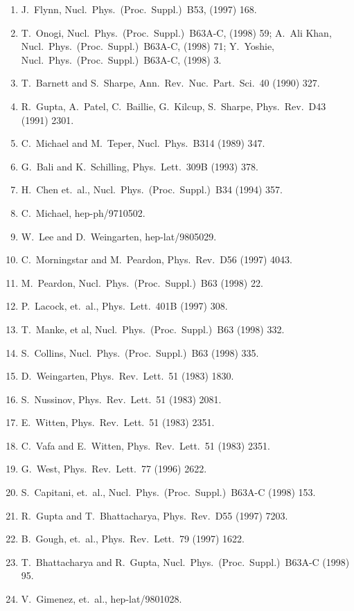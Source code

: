 \begin{enumerate}
\item J.~Flynn, Nucl.\ Phys.\ (Proc.\ Suppl.)\ B53, (1997) 168.
\item T.~Onogi, Nucl.\ Phys.\ (Proc.\ Suppl.)\ B63A-C, (1998) 59; A.~Ali Khan, Nucl.\ Phys.\ (Proc.\ Suppl.)\ B63A-C, (1998) 71; Y.~Yoshie, Nucl.\ Phys.\ (Proc.\ Suppl.)\ B63A-C, (1998) 3.
\item T.~Barnett and S.~Sharpe, Ann.\ Rev.\ Nuc.\ Part.\ Sci.\ 40 (1990) 327.
\item R.~Gupta, A.~Patel, C.~Baillie, G.~Kilcup, S.~Sharpe, Phys.\ Rev.\ D43 (1991) 2301.
\item C.~Michael and M.~Teper, Nucl.\ Phys.\ B314 (1989) 347.
\item G.~Bali and K.~Schilling, Phys.\ Lett.\ 309B (1993) 378.
\item H.~Chen et.\ al., Nucl.\ Phys.\ (Proc.\ Suppl.)\ B34 (1994) 357.
\item C.~Michael, hep-ph/9710502.
\item W.~Lee and D.~Weingarten, hep-lat/9805029.
\item C.~Morningstar and M.~Peardon, Phys.\ Rev.\ D56 (1997) 4043.
\item M.~Peardon, Nucl.\ Phys.\ (Proc.\ Suppl.)\ B63 (1998) 22.
\item P.~Lacock, et.\ al., Phys.\ Lett.\ 401B (1997) 308.
\item T.~Manke, et al, Nucl.\ Phys.\ (Proc.\ Suppl.)\ B63 (1998) 332.
\item S.~Collins, Nucl.\ Phys.\ (Proc.\ Suppl.)\ B63 (1998) 335.
\item D.~Weingarten, Phys.\ Rev.\ Lett.\ 51 (1983) 1830.
\item S.~Nussinov, Phys.\ Rev.\ Lett.\ 51 (1983) 2081.
\item E.~Witten, Phys.\ Rev.\ Lett.\ 51 (1983) 2351.
\item C.~Vafa and E.~Witten, Phys.\ Rev.\ Lett.\ 51 (1983) 2351.
\item G.~West, Phys.\ Rev.\ Lett.\ 77 (1996) 2622.
\item S.~Capitani, et.\ al., Nucl.\ Phys.\ (Proc.\ Suppl.)\ B63A-C (1998) 153.
\item R.~Gupta and T.~Bhattacharya, Phys.\ Rev.\ D55 (1997) 7203.
\item B.~Gough, et.\ al., Phys.\ Rev.\ Lett.\ 79 (1997) 1622.
\item T.~Bhattacharya and R.~Gupta, Nucl.\ Phys.\ (Proc.\ Suppl.)\ B63A-C (1998) 95.
\item V.~Gimenez, et.\ al., hep-lat/9801028.

\end{enumerate}
